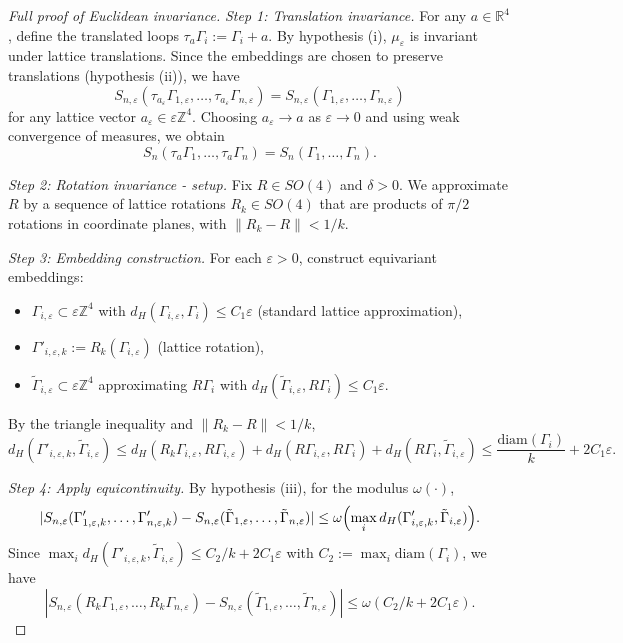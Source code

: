 \documentclass[11pt]{amsart}
\begin{document}
\begin{proof}[Full proof of Euclidean invariance]
\emph{Step 1: Translation invariance.} For any $a \in \mathbb{R}^4$, define the translated loops $\tau_a\Gamma_i := \Gamma_i + a$. By hypothesis (i), $\mu_\varepsilon$ is invariant under lattice translations. Since the embeddings are chosen to preserve translations (hypothesis (ii)), we have
\[
  S_{n,\varepsilon}(\tau_{a_\varepsilon}\Gamma_{1,\varepsilon}, \ldots, \tau_{a_\varepsilon}\Gamma_{n,\varepsilon}) = S_{n,\varepsilon}(\Gamma_{1,\varepsilon}, \ldots, \Gamma_{n,\varepsilon})
\]
for any lattice vector $a_\varepsilon \in \varepsilon\mathbb{Z}^4$. Choosing $a_\varepsilon \to a$ as $\varepsilon \to 0$ and using weak convergence of measures, we obtain
\[
  S_n(\tau_a\Gamma_1, \ldots, \tau_a\Gamma_n) = S_n(\Gamma_1, \ldots, \Gamma_n).
\]

\emph{Step 2: Rotation invariance - setup.} Fix $R \in SO(4)$ and $\delta > 0$. We approximate $R$ by a sequence of lattice rotations $R_k \in SO(4)$ that are products of $\pi/2$ rotations in coordinate planes, with $\|R_k - R\| < 1/k$.

\emph{Step 3: Embedding construction.} For each $\varepsilon > 0$, construct equivariant embeddings:
\begin{itemize}
  \item $\Gamma_{i,\varepsilon} \subset \varepsilon\mathbb{Z}^4$ with $d_H(\Gamma_{i,\varepsilon}, \Gamma_i) \le C_1\varepsilon$ (standard lattice approximation),
  \item $\Gamma'_{i,\varepsilon,k} := R_k(\Gamma_{i,\varepsilon})$ (lattice rotation),
  \item $\tilde{\Gamma}_{i,\varepsilon} \subset \varepsilon\mathbb{Z}^4$ approximating $R\Gamma_i$ with $d_H(\tilde{\Gamma}_{i,\varepsilon}, R\Gamma_i) \le C_1\varepsilon$.
\end{itemize}
By the triangle inequality and $\|R_k - R\| < 1/k$,
\[
  d_H(\Gamma'_{i,\varepsilon,k}, \tilde{\Gamma}_{i,\varepsilon}) \le d_H(R_k\Gamma_{i,\varepsilon}, R\Gamma_{i,\varepsilon}) + d_H(R\Gamma_{i,\varepsilon}, R\Gamma_i) + d_H(R\Gamma_i, \tilde{\Gamma}_{i,\varepsilon}) \le \frac{\text{diam}(\Gamma_i)}{k} + 2C_1\varepsilon.
\]

\emph{Step 4: Apply equicontinuity.} By hypothesis (iii), for the modulus $\omega(\cdot)$,
\[
  |S_{n,\varepsilon}(\Gamma'_{1,\varepsilon,k}, \ldots, \Gamma'_{n,\varepsilon,k}) - S_{n,\varepsilon}(\tilde{\Gamma}_{1,\varepsilon}, \ldots, \tilde{\Gamma}_{n,\varepsilon})| \le \omega\Bigl(\max_i d_H(\Gamma'_{i,\varepsilon,k}, \tilde{\Gamma}_{i,\varepsilon})\Bigr).
\]
Since $\max_i d_H(\Gamma'_{i,\varepsilon,k}, \tilde{\Gamma}_{i,\varepsilon}) \le C_2/k + 2C_1\varepsilon$ with $C_2 := \max_i \text{diam}(\Gamma_i)$, we have
\[
  |S_{n,\varepsilon}(R_k\Gamma_{1,\varepsilon}, \ldots, R_k\Gamma_{n,\varepsilon}) - S_{n,\varepsilon}(\tilde{\Gamma}_{1,\varepsilon}, \ldots, \tilde{\Gamma}_{n,\varepsilon})| \le \omega(C_2/k + 2C_1\varepsilon).
\]


\end{proof}
\end{document}
